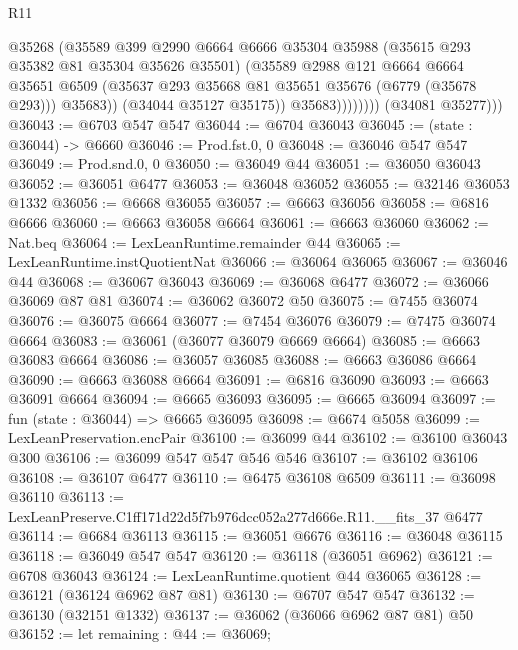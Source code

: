 \begin{lexlean}{R11}
\begin{coremodule}
                          @35268
                          (@35589
                            @399
                            @2990
                            @6664
                            @6666
                            @35304
                            @35988
                            (@35615 @293 @35382 @81 @35304 @35626 @35501)
                            (@35589
                              @2988
                              @121
                              @6664
                              @6664
                              @35651
                              @6509
                              (@35637 @293 @35668 @81 @35651 @35676 (@6779 (@35678 @293)))
                              @35683))
                          (@34044 @35127 @35175))
                        @35683))))))))
        (@34081 @35277)))
@36043 := @6703 @547 @547
@36044 := @6704 @36043
@36045 := (state : @36044) -> @6660
@36046 := Prod.fst.{0, 0}
@36048 := @36046 @547 @547
@36049 := Prod.snd.{0, 0}
@36050 := @36049 @44
@36051 := @36050 @36043
@36052 := @36051 @6477
@36053 := @36048 @36052
@36055 := @32146 @36053 @1332
@36056 := @6668 @36055
@36057 := @6663 @36056
@36058 := @6816 @6666
@36060 := @6663 @36058 @6664
@36061 := @6663 @36060
@36062 := Nat.beq
@36064 := LexLeanRuntime.remainder @44
@36065 := LexLeanRuntime.instQuotientNat
@36066 := @36064 @36065
@36067 := @36046 @44
@36068 := @36067 @36043
@36069 := @36068 @6477
@36072 := @36066 @36069 @87 @81
@36074 := @36062 @36072 @50
@36075 := @7455 @36074
@36076 := @36075 @6664
@36077 := @7454 @36076
@36079 := @7475 @36074 @6664
@36083 := @36061 (@36077 @36079 @6669 @6664)
@36085 := @6663 @36083 @6664
@36086 := @36057 @36085
@36088 := @6663 @36086 @6664
@36090 := @6663 @36088 @6664
@36091 := @6816 @36090
@36093 := @6663 @36091 @6664
@36094 := @6665 @36093
@36095 := @6665 @36094
@36097 := fun (state : @36044) => @6665 @36095
@36098 := @6674 @5058
@36099 := LexLeanPreservation.encPair
@36100 := @36099 @44
@36102 := @36100 @36043 @300
@36106 := @36099 @547 @547 @546 @546
@36107 := @36102 @36106
@36108 := @36107 @6477
@36110 := @6475 @36108 @6509
@36111 := @36098 @36110
@36113 := LexLeanPreserve.C1ff171d22d5f7b976dcc052a277d666e.R11.__fits_37 @6477
@36114 := @6684 @36113
@36115 := @36051 @6676
@36116 := @36048 @36115
@36118 := @36049 @547 @547
@36120 := @36118 (@36051 @6962)
@36121 := @6708 @36043
@36124 := LexLeanRuntime.quotient @44 @36065
@36128 := @36121 (@36124 @6962 @87 @81)
@36130 := @6707 @547 @547
@36132 := @36130 (@32151 @1332)
@36137 := @36062 (@36066 @6962 @87 @81) @50
@36152 := let remaining : @44 := @36069;

\end{coremodule}
\end{lexlean}
